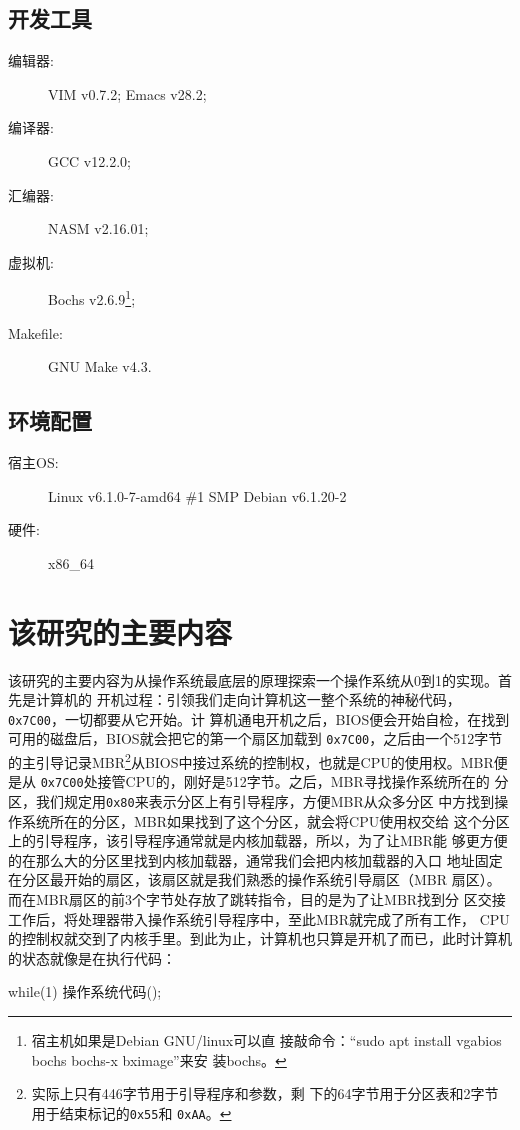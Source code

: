 \subsection{开发工具}

\begin{description}
\item[编辑器:] VIM v0.7.2; Emacs v28.2;
\item[编译器:] GCC v12.2.0;
\item[汇编器:] NASM v2.16.01;
\item[虚拟机:] Bochs v2.6.9\footnote{宿主机如果是Debian GNU/linux可以直
    接敲命令：“sudo apt install vgabios bochs bochs-x bximage”来安
    装bochs。};
\item[Makefile:] GNU Make v4.3.
\end{description}

\subsection{环境配置}

\begin{description}
\item[宿主OS:] Linux v6.1.0-7-amd64 \#1 SMP Debian v6.1.20-2
\item[硬件:] x86\_64
\end{description}

\section{该研究的主要内容}

该研究的主要内容为从操作系统最底层的原理探索一个操作系统从0到1的实现。首先是计算机的
开机过程：引领我们走向计算机这一整个系统的神秘代码，\texttt{0x7C00}，一切都要从它开始。计
算机通电开机之后，BIOS便会开始自检，在找到可用的磁盘后，BIOS就会把它的第一个扇区加载到
\texttt{0x7C00}，之后由一个512字节的主引导记录MBR\footnote{实际上只有446字节用于引导程序和参数，剩
  下的64字节用于分区表和2字节用于结束标记的\texttt{0x55}和
  \texttt{0xAA}。}从BIOS中接过系统的控制权，也就是CPU的使用权。MBR便是从
\texttt{0x7C00}处接管CPU的，刚好是512字节。之后，MBR寻找操作系统所在的
分区，我们规定用\texttt{0x80}来表示分区上有引导程序，方便MBR从众多分区
中方找到操作系统所在的分区，MBR如果找到了这个分区，就会将CPU使用权交给
这个分区上的引导程序，该引导程序通常就是内核加载器，所以，为了让MBR能
够更方便的在那么大的分区里找到内核加载器，通常我们会把内核加载器的入口
地址固定在分区最开始的扇区，该扇区就是我们熟悉的操作系统引导扇区（MBR
扇区）。而在MBR扇区的前3个字节处存放了跳转指令，目的是为了让MBR找到分
区交接工作后，将处理器带入操作系统引导程序中，至此MBR就完成了所有工作，
CPU的控制权就交到了内核手里。到此为止，计算机也只算是开机了而已，此时计算机的状态就像是在执行代码：
\begin{codeblock}
\begin{ccode}
while(1)
{
  操作系统代码();
}
\end{ccode}  
\end{codeblock}

